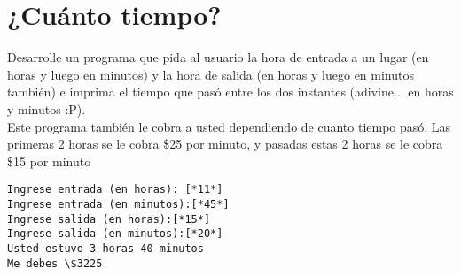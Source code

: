 \section{¿Cuánto tiempo?}
Desarrolle un programa que pida al usuario la hora de entrada a un lugar (en horas y luego en minutos) y la hora de salida (en horas y luego en minutos también) e imprima el tiempo que pasó entre los dos instantes (adivine... en horas y minutos :P).
\\
Este programa también le cobra a usted dependiendo de cuanto tiempo pasó. Las primeras 2 horas se le cobra \$25 por minuto, y pasadas estas 2 horas se le cobra \$15 por minuto
\\
\begin{lstlisting}[style=consola]
Ingrese entrada (en horas): [*11*]
Ingrese entrada (en minutos):[*45*]
Ingrese salida (en horas):[*15*]
Ingrese salida (en minutos):[*20*]
Usted estuvo 3 horas 40 minutos
Me debes \$3225
\end{lstlisting} 
